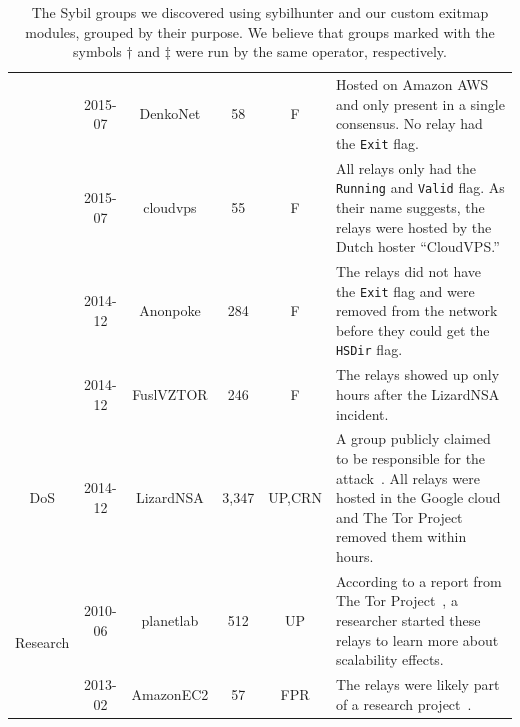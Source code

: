 \begin{table}[t]
\begin{tabularx}{\textwidth}{c|c c c c X}
& 2015-07 & DenkoNet & 58 & F & Hosted on Amazon AWS and only present in a single
consensus.  No relay had the \texttt{Exit} flag. \\

& 2015-07 & cloudvps & 55 & F & All relays only had the \texttt{Running} and
\texttt{Valid} flag.  As their name suggests, the relays were hosted by the
Dutch hoster ``CloudVPS.'' \\

& 2014-12 & Anonpoke & 284 & F & The relays did not have the \texttt{Exit} flag
and were removed from the network before they could get the \texttt{HSDir} flag.
\\

& 2014-12 & FuslVZTOR & 246 & F & The relays showed up only hours after the
LizardNSA incident. \\

\hline

\multirow{1}{*}{DoS}
& 2014-12 & LizardNSA & 3,347 & UP,CRN & A group publicly claimed to be responsible
for the attack~\cite{lizards}.  All relays were hosted in the Google cloud and
The Tor Project removed them within hours. \\

\hline

\multirow{2}{*}{Research}
& 2010-06 & planetlab & 512 & UP & According to a report from The Tor
Project~\cite{progressreport}, a researcher started these relays to learn more
about scalability effects. \\

& 2013-02 & AmazonEC2 & 57 & FPR & The relays were likely part of a research
project~\cite{Biryukov2013a}. \\

\end{tabularx}
\caption{The Sybil groups we discovered using sybilhunter and our custom exitmap
modules, grouped by their purpose.  We believe that groups marked with the
symbols $\dagger$ and $\ddagger$ were run by the same operator, respectively.}
\label{tab:sybils}
\end{table}

